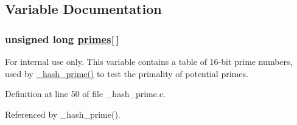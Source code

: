 \subsection{Variable Documentation}
\hypertarget{group__dbprim__hash_ga0}{
\subsubsection[primes]{\setlength{\rightskip}{0pt plus 5cm}unsigned long \hyperlink{group__dbprim__hash_ga0}{primes}\mbox{[}$\,$\mbox{]}}}
\label{group__dbprim__hash_ga0}


\begin{Desc}
\item[For internal use only.]
This variable contains a table of 16-bit prime numbers, used by \hyperlink{group__dbprim__hash_ga20}{\_\-hash\_\-prime()} to test the primality of potential primes.\end{Desc}


Definition at line 50 of file \_\-hash\_\-prime.c.

Referenced by \_\-hash\_\-prime().